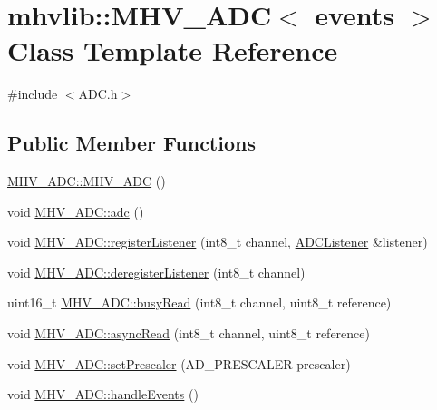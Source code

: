 \hypertarget{classmhvlib_1_1_m_h_v___a_d_c}{\section{mhvlib\-:\-:M\-H\-V\-\_\-\-A\-D\-C$<$ events $>$ Class Template Reference}
\label{classmhvlib_1_1_m_h_v___a_d_c}
}


{\ttfamily \#include $<$A\-D\-C.\-h$>$}

\subsection*{Public Member Functions}
\begin{DoxyCompactItemize}
\item 
\hyperlink{classmhvlib_1_1_m_h_v___a_d_c_a84995609e4c8ba4cafacd8b70bb364f0}{M\-H\-V\-\_\-\-A\-D\-C\-::\-M\-H\-V\-\_\-\-A\-D\-C} ()
\item 
void \hyperlink{classmhvlib_1_1_m_h_v___a_d_c_ad4f7bf989696ab44612a14bbbda60701}{M\-H\-V\-\_\-\-A\-D\-C\-::adc} ()
\item 
void \hyperlink{classmhvlib_1_1_m_h_v___a_d_c_acfd5cf521ef30a7cd5423afb99d604b3}{M\-H\-V\-\_\-\-A\-D\-C\-::register\-Listener} (int8\-\_\-t channel, \hyperlink{classmhvlib_1_1_a_d_c_listener}{A\-D\-C\-Listener} \&listener)
\item 
void \hyperlink{classmhvlib_1_1_m_h_v___a_d_c_a3ef2965fef9c67d9f52f71194ec0d9df}{M\-H\-V\-\_\-\-A\-D\-C\-::deregister\-Listener} (int8\-\_\-t channel)
\item 
uint16\-\_\-t \hyperlink{classmhvlib_1_1_m_h_v___a_d_c_a2a6f3e148d85baddfc6524c0009feda9}{M\-H\-V\-\_\-\-A\-D\-C\-::busy\-Read} (int8\-\_\-t channel, uint8\-\_\-t reference)
\item 
void \hyperlink{classmhvlib_1_1_m_h_v___a_d_c_ac813a4f6ea0907649324a092dd25c868}{M\-H\-V\-\_\-\-A\-D\-C\-::async\-Read} (int8\-\_\-t channel, uint8\-\_\-t reference)
\item 
void \hyperlink{classmhvlib_1_1_m_h_v___a_d_c_a5fe08d6b4f22c0ee10e8b6f0548a285a}{M\-H\-V\-\_\-\-A\-D\-C\-::set\-Prescaler} (A\-D\-\_\-\-P\-R\-E\-S\-C\-A\-L\-E\-R prescaler)
\item 
void \hyperlink{classmhvlib_1_1_m_h_v___a_d_c_aba04a71e25ad7bf04ebbd87557e5d81e}{M\-H\-V\-\_\-\-A\-D\-C\-::handle\-Events} ()
\end{DoxyCompactItemize}
